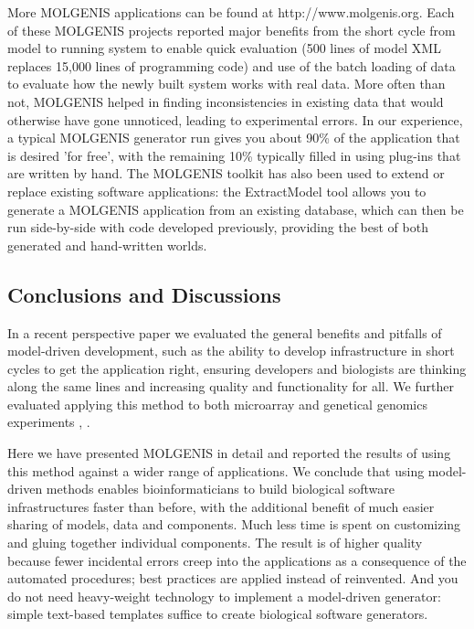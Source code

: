 More MOLGENIS applications can be found at http://www.molgenis.org. Each of these MOLGENIS projects 
reported major benefits from the short cycle from model to running system to enable quick evaluation 
(500 lines of model XML replaces 15,000 lines of programming code) and use of the batch loading of 
data to evaluate how the newly built system works with real data. More often than not, MOLGENIS 
helped in finding inconsistencies in existing data that would otherwise have gone unnoticed, leading 
to experimental errors. In our experience, a typical MOLGENIS generator run gives you about 90\% of 
the application that is desired 'for free', with the remaining 10\% typically filled in using plug-ins 
that are written by hand. The MOLGENIS toolkit has also been used to extend or replace existing 
software applications: the ExtractModel tool allows you to generate a MOLGENIS application from an 
existing database, which can then be run side-by-side with code developed previously, providing the 
best of both generated and hand-written worlds.

\subsection{Conclusions and Discussions}
In a recent perspective paper \cite{Swertz:2007} we evaluated the general benefits and pitfalls of model-driven 
development, such as the ability to develop infrastructure in short cycles to get the application 
right, ensuring developers and biologists are thinking along the same lines and increasing quality 
and functionality for all. We further evaluated applying this method to both microarray and genetical 
genomics experiments \cite{Swertz:2004}, \cite{Swertz:2010a}	.

Here we have presented MOLGENIS in detail and reported the results of using this method against a 
wider range of applications. We conclude that using model-driven methods enables bioinformaticians 
to build biological software infrastructures faster than before, with the additional benefit of 
much easier sharing of models, data and components. Much less time is spent on customizing and gluing 
together individual components. The result is of higher quality because fewer incidental errors creep 
into the applications as a consequence of the automated procedures; best practices are applied 
instead of reinvented. And you do not need heavy-weight technology to implement a model-driven 
generator: simple text-based templates suffice to create biological software generators.

